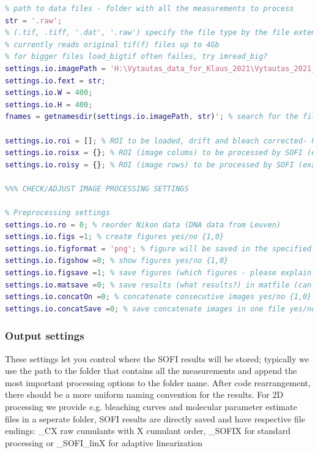 \documentclass[final]{scrartcl}
\begin{document}
\begin{lstlisting}[language=Matlab] 
% INPUT SETTINGS
% path to data files - folder with all the measurements to process
str = '.raw';
% (.tif, .tiff, '.dat', '.raw') specify the file type by the file extension, 
% currently reads original tif(f) files up to 4Gb
% for bigger files load_bigtif often failes, try imread_big?
settings.io.imagePath = 'H:\Vytautas_data_for_Klaus_2021\Vytautas_2021_01_07\SNR_estimation_with_JK\DATA';
settings.io.fext = str;
settings.io.W = 400;
settings.io.H = 400;
fnames = getnamesdir(settings.io.imagePath, str)'; % search for the file names automatically

settings.io.roi = []; % ROI to be loaded, drift and bleach corrected- keep empty [] if the whole image should be used
settings.io.roisx = {}; % ROI (image colums) to be processed by SOFI (example "settings.io.roisx = {61:360}")
settings.io.roisy = {}; % ROI (image rows) to be processed by SOFI (example "settings.io.roisy = {61:360}")

%%% CHECK/ADJUST IMAGE PROCESSING SETTINGS

% Preprocessing settings
settings.io.ro = 0; % reorder Nikon data (DNA data from Leuven)
settings.io.figs =1; % create figures yes/no {1,0}
settings.io.figformat = 'png'; % figure will be saved in the specified format {'fig','png','pdf'}
settings.io.figshow =0; % show figures yes/no {1,0}
settings.io.figsave =1; % save figures (which figures - please explain difference in scaling) yes/no {1,0}
settings.io.matsave =0; % save results (what results?) in matfile (can take a lot of memory on the drive)
settings.io.concatOn =0; % concatenate consecutive images yes/no {1,0} TODO: needs better explanation!
settings.io.concatSave =0; % save concatenate images in one file yes/no {1,0} TODO: needs better explanation!
\end{lstlisting}

\subsubsection*{Output settings}
These settings let you control where the SOFI results will be stored; typically we use the path to the folder that contains all the measurements and append the most important processing options to the folder name.
After code rearrangement, there should be a more uniform naming convention for the results. For 2D processing we provide e.g. bleaching curves and molecular parameter estimate files in a seperate folder, SOFI results are directly saved and have respective file endings: _CX raw cumulants with X cumulant order, _SOFIX for standard processing or _SOFI_linX for adaptive linearization
\end{document}
